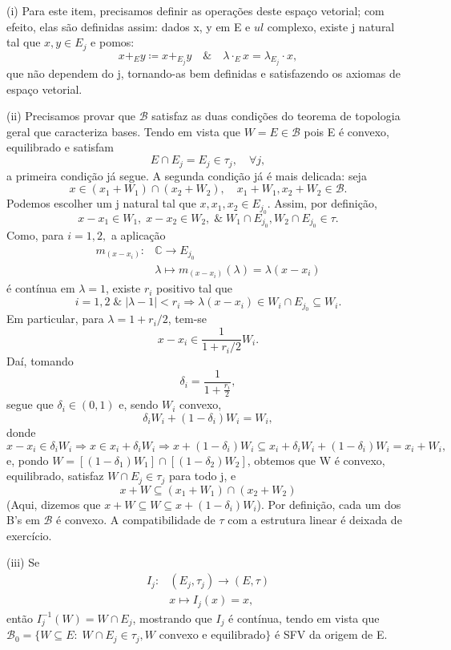 \documentclass[../distribution_theory_notes.tex]{subfiles}
\begin{document}
\begin{proof*}
	(i) Para este item, precisamos definir as operações deste espaço vetorial; com efeito, elas são definidas assim: dados x, y em E e \( ul\) complexo, existe j natural tal que \(x, y\in E_{j}\) e pomos:
	\[
		x+_{E}y\coloneqq x +_{E_{j}}y \quad\&\quad \lambda \cdot_{E} x = \lambda_{E_{j}} \cdot x,
	\]
	que não dependem do j, tornando-as bem definidas e satisfazendo os axiomas de espaço vetorial.

	(ii) Precisamos provar que \(\mathcal{B}\) satisfaz as duas condições do teorema de topologia geral que caracteriza bases. Tendo em vista que \(W=E\in \mathcal{B}\) pois E é convexo, equilibrado e satisfam
	\[
		E\cap E_{j}=E_{j}\in \tau_{j},\quad \forall j,
	\]
	a primeira condição já segue. A segunda condição já é mais delicada: seja
	\[
		x\in (x_1+W_{1})\cap (x_2+W_2), \quad x_1+W_1, x_2+W_2\in \mathcal{B}.
	\]
	Podemos escolher um j natural tal que \(x, x_1, x_2\in E_{j_{0}}\). Assim, por definição,
	\[
		x-x_1\in W_1,\; x-x_2\in W_2, \;\&\; W_1\cap E_{j_{0}}, W_2\cap E_{j_{0}}\in \tau.
	\]
	Como, para \(i=1, 2,\) a aplicação
	\begin{align*}
		m_{(x-x_{i})}: & \mathbb{C}\rightarrow E_{j_{0}}                           \\
		               & \lambda \mapsto m_{(x-x_{i})}(\lambda )=\lambda (x-x_{i})
	\end{align*}
	é contínua em \(\lambda =1\), existe \(r_{i}\) positivo tal que
	\[
		i=1,2 \;\&\; |\lambda -1|<r_{i} \Rightarrow \lambda (x-x_{i})\in W_{i}\cap E_{j_{0}}\subseteq W_{i}.
	\]
	Em particular, para \(\lambda  = 1 + r_{i}/2\), tem-se
	\[
		x-x_{i}\in \frac{1}{1+r_{i}/2}W_{i}.
	\]
	Daí, tomando
	\[
		\delta_{i}=\frac{1}{1+\frac{r_{i}}{2}},
	\]
	segue que \(\delta_{i}\in (0, 1)\) e, sendo \(W_{i}\) convexo,
	\[
		\delta_{i} W_{i} + (1-\delta_{i})W_{i}=W_{i},
	\]
	donde
	\[
		x-x_{i}\in \delta_{i}W_{i} \Rightarrow x\in x_{i}+\delta_{i}W_{i}\Rightarrow x+(1-\delta_{i})W_{i}\subseteq x_{i}+\delta_{i}W_{i}+(1-\delta_{i})W_{i} = x_{i}+W_{i},
	\]
	e, pondo \(W=[(1-\delta_{1})W_1]\cap [(1-\delta_2)W_2]\), obtemos que W é convexo, equilibrado, satisfaz \(W\cap E_{j}\in \tau_{j}\) para todo j, e
	\[
		x+W\subseteq (x_1+W_1)\cap (x_2+W_2)
	\]
	(Aqui, dizemos que \(x+W\subseteq W\subseteq x+(1-\delta_{i})W_{i}\)). Por definição, cada um dos B's em \(\mathcal{B}\) é convexo. A compatibilidade de \(\tau \) com a estrutura linear é deixada de exercício.

	(iii) Se
	\begin{align*}
		I_{j}: & (E_{j}, \tau_{j})\rightarrow (E, \tau ) \\
		       & x\mapsto I_{j}(x)=x,
	\end{align*}
	então \(I_{j}^{-1}(W)=W\cap E_{j}\), mostrando que \(I_{j}\) é contínua, tendo em vista que \(\mathcal{B}_{0}=\{W\subseteq E:\; W\cap E_{j}\in \tau_{j}, W \text{ convexo e equilibrado}\}\) é SFV da origem de E.


\end{proof*}
\end{document}
